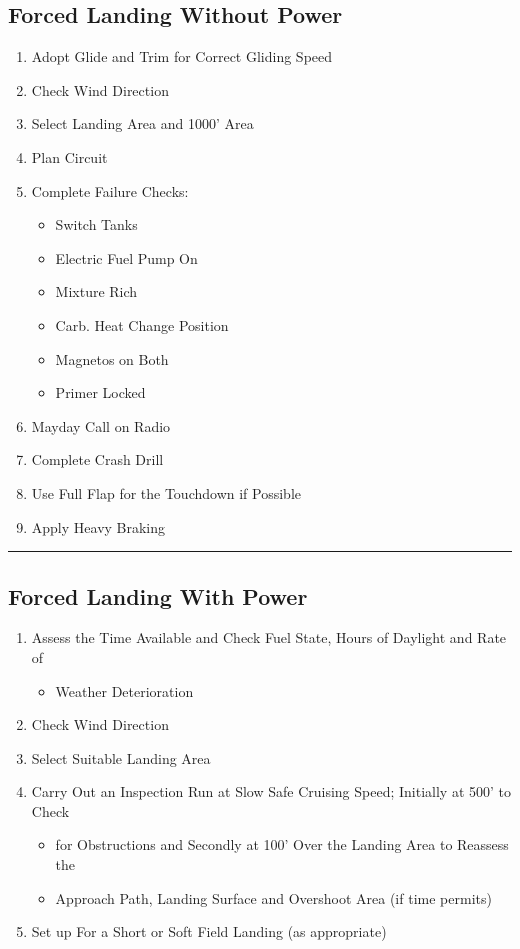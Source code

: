 \documentclass[a4paper]{article}
\newenvironment{checklist}{
  \begin{itemize}[leftmargin=*, align=left]
    \setlength{\itemsep}{2pt}
    \setlength{\parskip}{0pt}
    \setlength{\parsep}{0pt}
}{
  \end{itemize}
}
\newenvironment{numberedchecklist}{
  \begin{enumerate}[label=\arabic*., leftmargin=*, align=left]
    \setlength{\itemsep}{2pt}
    \setlength{\parskip}{0pt}
    \setlength{\parsep}{0pt}
}{
  \end{enumerate}
}
\begin{document}
\subsection*{Forced Landing Without Power}
\begin{numberedchecklist}
\item Adopt Glide and Trim for Correct Gliding Speed
\item Check Wind Direction
\item Select Landing Area and 1000' Area
\item Plan Circuit
\item Complete Failure Checks:
  \begin{checklist}
  \item Switch Tanks
  \item Electric Fuel Pump On
  \item Mixture Rich
  \item Carb. Heat Change Position
  \item Magnetos on Both
  \item Primer Locked
  \end{checklist}
\item Mayday Call on Radio
\item Complete Crash Drill
\item Use Full Flap for the Touchdown if Possible
\item Apply Heavy Braking
\end{numberedchecklist}

\rule{\linewidth}{0.4pt}

\subsection*{Forced Landing With Power}
\begin{numberedchecklist}
\item Assess the Time Available and Check Fuel State, Hours of Daylight and Rate of
  \begin{checklist}
  \item Weather Deterioration
  \end{checklist}
\item Check Wind Direction
\item Select Suitable Landing Area
\item Carry Out an Inspection Run at Slow Safe Cruising Speed; Initially at 500' to Check
  \begin{checklist}
  \item for Obstructions and Secondly at 100' Over the Landing Area to Reassess the
  \item Approach Path, Landing Surface and Overshoot Area (if time permits)
  \end{checklist}
\item Set up For a Short or Soft Field Landing (as appropriate)
\end{numberedchecklist}
\end{document}
